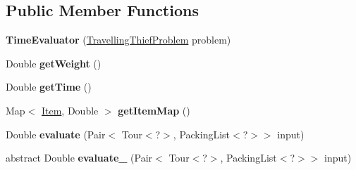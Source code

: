 \subsection*{Public Member Functions}
\begin{DoxyCompactItemize}
\item 
\hypertarget{classcom_1_1msu_1_1thief_1_1evaluator_1_1time_1_1TimeEvaluator_aec5919eb1094217c4c15f203ddffb0c7}{{\bfseries Time\-Evaluator} (\hyperlink{classcom_1_1msu_1_1thief_1_1problems_1_1TravellingThiefProblem}{Travelling\-Thief\-Problem} problem)}\label{classcom_1_1msu_1_1thief_1_1evaluator_1_1time_1_1TimeEvaluator_aec5919eb1094217c4c15f203ddffb0c7}

\item 
\hypertarget{classcom_1_1msu_1_1thief_1_1evaluator_1_1time_1_1TimeEvaluator_a39a77d5389465bac3be3daa2d58ceedf}{Double {\bfseries get\-Weight} ()}\label{classcom_1_1msu_1_1thief_1_1evaluator_1_1time_1_1TimeEvaluator_a39a77d5389465bac3be3daa2d58ceedf}

\item 
\hypertarget{classcom_1_1msu_1_1thief_1_1evaluator_1_1time_1_1TimeEvaluator_ade92825af0ef8792561b7ab2971870a3}{Double {\bfseries get\-Time} ()}\label{classcom_1_1msu_1_1thief_1_1evaluator_1_1time_1_1TimeEvaluator_ade92825af0ef8792561b7ab2971870a3}

\item 
\hypertarget{classcom_1_1msu_1_1thief_1_1evaluator_1_1time_1_1TimeEvaluator_ace791e85c5b203add7bcd874eceda9cd}{Map$<$ \hyperlink{classcom_1_1msu_1_1thief_1_1model_1_1Item}{Item}, Double $>$ {\bfseries get\-Item\-Map} ()}\label{classcom_1_1msu_1_1thief_1_1evaluator_1_1time_1_1TimeEvaluator_ace791e85c5b203add7bcd874eceda9cd}

\item 
\hypertarget{classcom_1_1msu_1_1thief_1_1evaluator_1_1time_1_1TimeEvaluator_a6fce957d73ab6ae5cca29c920cd5aafc}{Double {\bfseries evaluate} (Pair$<$ Tour$<$?$>$, Packing\-List$<$?$>$$>$ input)}\label{classcom_1_1msu_1_1thief_1_1evaluator_1_1time_1_1TimeEvaluator_a6fce957d73ab6ae5cca29c920cd5aafc}

\item 
\hypertarget{classcom_1_1msu_1_1thief_1_1evaluator_1_1time_1_1TimeEvaluator_a26328a49fde69f2b4a3419ac74dc5c30}{abstract Double {\bfseries evaluate\-\_\-} (Pair$<$ Tour$<$?$>$, Packing\-List$<$?$>$$>$ input)}\label{classcom_1_1msu_1_1thief_1_1evaluator_1_1time_1_1TimeEvaluator_a26328a49fde69f2b4a3419ac74dc5c30}

\end{DoxyCompactItemize}
